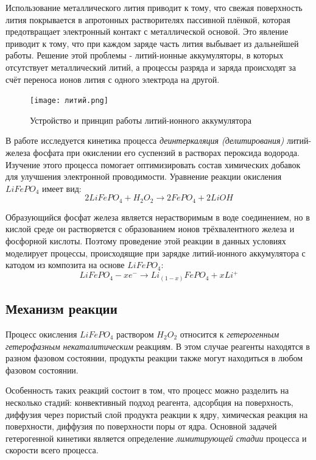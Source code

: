 \documentclass[a4paper,12pt]{article} %
\begin{document}
Использование металлического лития приводит к тому, что свежая поверхность лития покрывается в апротонных растворителях пассивной плёнкой, которая предотвращает электронный контакт с металлической основой. Это явление приводит к тому, что при каждом заряде часть лития выбывает из дальнейшей работы. Решение этой проблемы - литий-ионные аккумуляторы, в которых отсутствует металлический литий, а процессы разряда и заряда происходят за счёт переноса ионов лития с одного электрода на другой.\par 

\begin{figure}[H]
    \centering
    \texttt{[image: литий.png]}
    \caption{Устройство и принцип работы литий-ионного аккумулятора
}
    \label{pic:0}
\end{figure}

В работе исследуется кинетика процесса \textit{деинтеркаляция (делитирования)} литий-железа фосфата при окислении его суспензий в растворах пероксида водорода. Изучение этого процесса помогает оптимизировать состав химических добавок для улучшения электронной проводимости. Уравнение реакции окисления $LiFePO_4$ имеет вид:
$$2LiFePO_4+H_2O_2 \rightarrow 2FePO_4 + 2LiOH$$\par 
Образующийся фосфат железа является нерастворимым в воде соединением, но в кислой среде он растворяется с образованием ионов трёхвалентного железа и фосфорной кислоты. Поэтому проведение этой реакции в данных условиях моделирует процессы, происходящие при зарядке литий-ионного аккумулятора с катодом из композита на основе $LiFePO_4$:
$$LiFePO_4 - xe^- \rightarrow Li_{(1-x)}FePO_4 + xLi^+$$\par 

\subsection{Механизм реакции}
Процесс окисления $LiFePO_4$ раствором $H_2O_2$ относится к \textit{гетерогенным гетерофазным некаталитическим} реакциям. В этом случае реагенты находятся в разном фазовом состоянии, продукты реакции также могут находиться в любом фазовом состоянии. \par 

Особенность таких реакций состоит в том, что процесс можно разделить на несколько стадий: конвективный подход реагента, адсорбция на поверхность, диффузия через пористый слой продукта реакции к ядру, химическая реакция на поверхности, диффузия по поверхности поры от ядра. Основной задачей гетерогенной кинетики является определение \textit{лимитирующей стадии} процесса и скорости всего процесса.\par 
\end{document}

